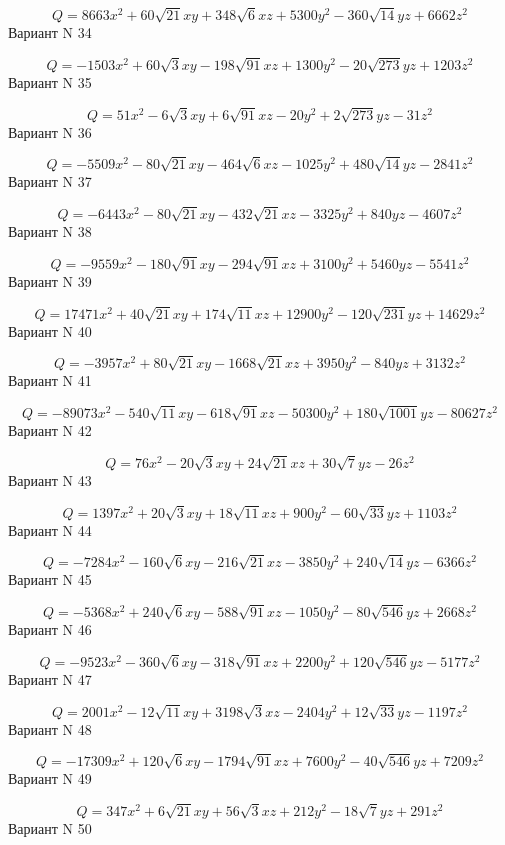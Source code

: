 \documentclass[11pt]{report}
\begin{document}
$$Q = 8663 x^{2} + 60 \sqrt{21} x y + 348 \sqrt{6} x z + 5300 y^{2} - 360 \sqrt{14} y z + 6662 z^{2}$$Вариант N 34

$$Q = - 1503 x^{2} + 60 \sqrt{3} x y - 198 \sqrt{91} x z + 1300 y^{2} - 20 \sqrt{273} y z + 1203 z^{2}$$Вариант N 35

$$Q = 51 x^{2} - 6 \sqrt{3} x y + 6 \sqrt{91} x z - 20 y^{2} + 2 \sqrt{273} y z - 31 z^{2}$$Вариант N 36

$$Q = - 5509 x^{2} - 80 \sqrt{21} x y - 464 \sqrt{6} x z - 1025 y^{2} + 480 \sqrt{14} y z - 2841 z^{2}$$Вариант N 37

$$Q = - 6443 x^{2} - 80 \sqrt{21} x y - 432 \sqrt{21} x z - 3325 y^{2} + 840 y z - 4607 z^{2}$$Вариант N 38

$$Q = - 9559 x^{2} - 180 \sqrt{91} x y - 294 \sqrt{91} x z + 3100 y^{2} + 5460 y z - 5541 z^{2}$$Вариант N 39

$$Q = 17471 x^{2} + 40 \sqrt{21} x y + 174 \sqrt{11} x z + 12900 y^{2} - 120 \sqrt{231} y z + 14629 z^{2}$$Вариант N 40

$$Q = - 3957 x^{2} + 80 \sqrt{21} x y - 1668 \sqrt{21} x z + 3950 y^{2} - 840 y z + 3132 z^{2}$$Вариант N 41

$$Q = - 89073 x^{2} - 540 \sqrt{11} x y - 618 \sqrt{91} x z - 50300 y^{2} + 180 \sqrt{1001} y z - 80627 z^{2}$$Вариант N 42

$$Q = 76 x^{2} - 20 \sqrt{3} x y + 24 \sqrt{21} x z + 30 \sqrt{7} y z - 26 z^{2}$$Вариант N 43

$$Q = 1397 x^{2} + 20 \sqrt{3} x y + 18 \sqrt{11} x z + 900 y^{2} - 60 \sqrt{33} y z + 1103 z^{2}$$Вариант N 44

$$Q = - 7284 x^{2} - 160 \sqrt{6} x y - 216 \sqrt{21} x z - 3850 y^{2} + 240 \sqrt{14} y z - 6366 z^{2}$$Вариант N 45

$$Q = - 5368 x^{2} + 240 \sqrt{6} x y - 588 \sqrt{91} x z - 1050 y^{2} - 80 \sqrt{546} y z + 2668 z^{2}$$Вариант N 46

$$Q = - 9523 x^{2} - 360 \sqrt{6} x y - 318 \sqrt{91} x z + 2200 y^{2} + 120 \sqrt{546} y z - 5177 z^{2}$$Вариант N 47

$$Q = 2001 x^{2} - 12 \sqrt{11} x y + 3198 \sqrt{3} x z - 2404 y^{2} + 12 \sqrt{33} y z - 1197 z^{2}$$Вариант N 48

$$Q = - 17309 x^{2} + 120 \sqrt{6} x y - 1794 \sqrt{91} x z + 7600 y^{2} - 40 \sqrt{546} y z + 7209 z^{2}$$Вариант N 49

$$Q = 347 x^{2} + 6 \sqrt{21} x y + 56 \sqrt{3} x z + 212 y^{2} - 18 \sqrt{7} y z + 291 z^{2}$$Вариант N 50
\end{document}
